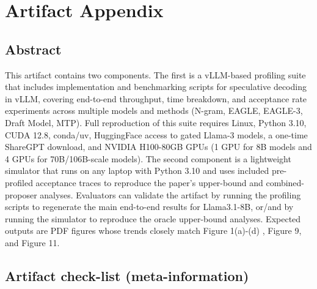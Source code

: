 \documentclass{article}
\begin{document}
\pagebreak
\section{Artifact Appendix}

\subsection{Abstract}

This artifact contains two components.
The first is a vLLM-based profiling suite that includes implementation and benchmarking scripts for speculative decoding in vLLM, covering end-to-end throughput, time breakdown, and acceptance rate experiments across multiple models and methods (N-gram, EAGLE, EAGLE-3, Draft Model, MTP). Full reproduction of this suite requires Linux, Python 3.10, CUDA 12.8, conda/uv, HuggingFace access to gated Llama-3 models, a one-time ShareGPT download, and NVIDIA H100-80GB GPUs (1 GPU for 8B models and 4 GPUs for 70B/106B-scale models).
The second component is a lightweight simulator that runs on any laptop with Python 3.10 and uses included pre-profiled acceptance traces to reproduce the paper’s upper-bound and combined-proposer analyses.
Evaluators can validate the artifact by running the profiling scripts to regenerate the main end-to-end results for Llama3.1-8B, or/and by running the simulator to reproduce the oracle upper-bound analyses. Expected outputs are PDF figures whose trends closely match Figure 1(a)-(d) , Figure 9, and Figure 11.

\subsection{Artifact check-list (meta-information)}
\end{document}
